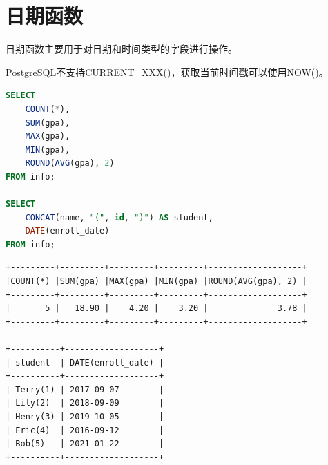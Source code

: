 \documentclass[12pt, openany, oneside]{book}
\begin{document}
\vspace{0.5cm}

\section{日期函数}

日期函数主要用于对日期和时间类型的字段进行操作。

\begin{table}[H]
	\centering
	\caption{日期函数}
\end{table}

PostgreSQL不支持CURRENT\_XXX()，获取当前时间戳可以使用NOW()。\\


\begin{lstlisting}[language=SQL]
SELECT
    COUNT(*),
    SUM(gpa),
    MAX(gpa),
    MIN(gpa),
    ROUND(AVG(gpa), 2)
FROM info;

SELECT
    CONCAT(name, "(", id, ")") AS student, 
    DATE(enroll_date)
FROM info;
\end{lstlisting}

\begin{tcolorbox}
\begin{verbatim}
+---------+---------+---------+---------+-------------------+
|COUNT(*) |SUM(gpa) |MAX(gpa) |MIN(gpa) |ROUND(AVG(gpa), 2) |
+---------+---------+---------+---------+-------------------+
|       5 |   18.90 |    4.20 |    3.20 |              3.78 |
+---------+---------+---------+---------+-------------------+

+----------+-------------------+
| student  | DATE(enroll_date) |
+----------+-------------------+
| Terry(1) | 2017-09-07        |
| Lily(2)  | 2018-09-09        |
| Henry(3) | 2019-10-05        |
| Eric(4)  | 2016-09-12        |
| Bob(5)   | 2021-01-22        |
+----------+-------------------+
	\end{verbatim}
\end{tcolorbox}
\end{document}
